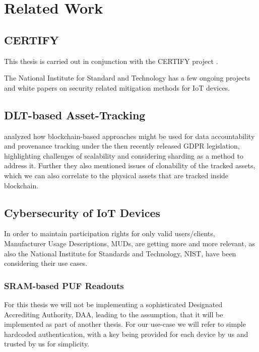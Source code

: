\chapter{Related Work}


\section{CERTIFY} %
\label{sec:CERTIFY}
This thesis is carried out in conjunction with the CERTIFY project \cite{certifyproject2023}.

The National Institute for Standard and Technology has a few ongoing projects and white papers on security related
mitigation methods for IoT devices.


\section{DLT-based Asset-Tracking} %
\label{sec:DLT-based Asset-Tracking}
\cite{neisse2017blockchain} analyzed how blockchain-based approaches might be used for data accountability and
provenance tracking under the then recently released GDPR legislation, highlighting challenges of scalability and
considering sharding as a method to address it. \cite{neisse2017blockchain} Further they also mentioned issues of
clonability of the tracked assets, which we can also correlate to the physical assets that are tracked inside
blockchain.


\section{Cybersecurity of IoT Devices} %
\label{sec:Cybersecurity of IoT Devices}

In order to maintain participation rights for only valid users/clients, Manufacturer Usage Descriptions, MUDs, are
getting more and more relevant, as also the National Institute for Standards and Technology, NIST, have been considering
their use cases. \cite{dodson2021securing}

\subsection{SRAM-based PUF Readouts} %
\label{sub:SRAM-based PUF Readouts}
For this thesis we will not be implementing a sophisticated Designated Accrediting Authority, DAA, leading to the
assumption, that it will be implemented as part of another thesis. For our use-case we will refer to simple
hardcoded authentication, with a key being provided for each device by us and trusted by us for simplicity.

